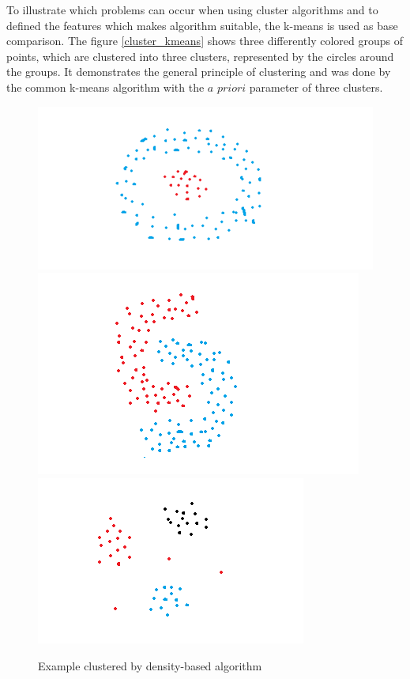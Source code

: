 \documentclass[a4paper,12pt]{report}
\begin{document}
To illustrate which problems can occur when using cluster algorithms and to defined the features which makes algorithm suitable, the k-means is used as base comparison. The figure \ref{cluster_kmeans} shows three differently colored groups of points, which are clustered into three clusters, represented by the circles around the groups. It demonstrates the general principle of clustering and was done by the common k-means algorithm with the $a$ $priori$ parameter of three clusters. 

\begin{figure}[h]
	\centering
	\includegraphics[scale=0.4]{./assets/cluster_1.png}
	\includegraphics[scale=0.4]{./assets/cluster_2.png}
	\includegraphics[scale=0.4]{./assets/cluster_3.png}
	\caption{Example clustered by density-based algorithm \cite{Yildirim2020}}
	\label{cluster_dbscan}
\end{figure}
\end{document}
